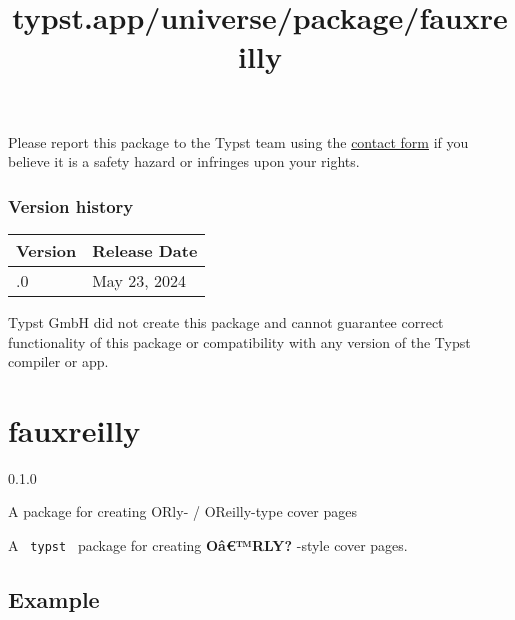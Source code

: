 Please report this package to the Typst team using the
\href{https://typst.app/contact}{contact form} if you believe it is a
safety hazard or infringes upon your rights.

\label{versions}
\subsubsection{Version history}\label{version-history}

\begin{longtable}[]{@{}ll@{}}
\toprule\noalign{}
Version & Release Date \\
\midrule\noalign{}
\endhead
\bottomrule\noalign{}
\endlastfoot
0.1.0 & May 23, 2024 \\
\end{longtable}

Typst GmbH did not create this package and cannot guarantee correct
functionality of this package or compatibility with any version of the
Typst compiler or app.


\title{typst.app/universe/package/fauxreilly}

\label{banner}
\section{fauxreilly}\label{fauxreilly}

{ 0.1.0 }

A package for creating O\textquotesingle Rly- /
O\textquotesingle Reilly-type cover pages

\label{readme}
\href{https://forthebadge.com/}{\pandocbounded{}}

\href{https://deilayborer.neocities.org/funding}{}

A \texttt{\ typst\ } package for creating \textbf{Oâ€™RLY?} -style cover
pages.

\subsection{Example}\label{example}

